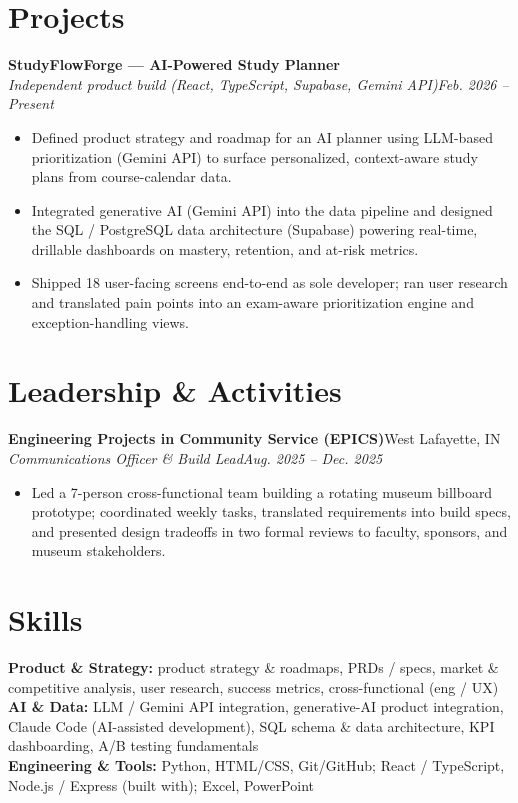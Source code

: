 \documentclass[10pt,letterpaper]{article}
\newcommand{\entry}[4]{%
  \textbf{#1}\hfill #2\\[1pt]
  \textit{#3}\hfill \textit{#4}\\[2pt]
}
\begin{document}
\section*{Projects}
\entry{StudyFlowForge --- AI-Powered Study Planner}{}{Independent product build (React, TypeScript, Supabase, Gemini API)}{Feb. 2026 -- Present}
\begin{itemize}
  \item Defined product strategy and roadmap for an AI planner using LLM-based prioritization (Gemini API) to surface personalized, context-aware study plans from course-calendar data.
  \item Integrated generative AI (Gemini API) into the data pipeline and designed the SQL / PostgreSQL data architecture (Supabase) powering real-time, drillable dashboards on mastery, retention, and at-risk metrics.
  \item Shipped 18 user-facing screens end-to-end as sole developer; ran user research and translated pain points into an exam-aware prioritization engine and exception-handling views.
\end{itemize}

\section*{Leadership \& Activities}
\entry{Engineering Projects in Community Service (EPICS)}{West Lafayette, IN}{Communications Officer \& Build Lead}{Aug. 2025 -- Dec. 2025}
\begin{itemize}
  \item Led a 7-person cross-functional team building a rotating museum billboard prototype; coordinated weekly tasks, translated requirements into build specs, and presented design tradeoffs in two formal reviews to faculty, sponsors, and museum stakeholders.
\end{itemize}

\section*{Skills}
\textbf{Product \& Strategy:} product strategy \& roadmaps, PRDs / specs, market \& competitive analysis, user research, success metrics, cross-functional (eng / UX)\\[2pt]
\textbf{AI \& Data:} LLM / Gemini API integration, generative-AI product integration, Claude Code (AI-assisted development), SQL schema \& data architecture, KPI dashboarding, A/B testing fundamentals\\[2pt]
\textbf{Engineering \& Tools:} Python, HTML/CSS, Git/GitHub; React / TypeScript, Node.js / Express (built with); Excel, PowerPoint
\end{document}
